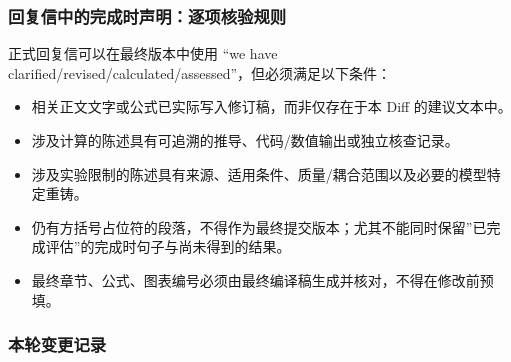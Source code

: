 \documentclass[
]{article}
\providecommand{\tightlist}{%
  \setlength{\itemsep}{0pt}\setlength{\parskip}{0pt}}
\begin{document}
\subsubsection{回复信中的完成时声明：逐项核验规则}\label{ux56deux590dux4fe1ux4e2dux7684ux5b8cux6210ux65f6ux58f0ux660eux9010ux9879ux6838ux9a8cux89c4ux5219}

正式回复信可以在最终版本中使用 ``we have
clarified/revised/calculated/assessed''，但必须满足以下条件：

\begin{itemize}
\tightlist
\item
  相关正文文字或公式已实际写入修订稿，而非仅存在于本 Diff 的建议文本中。
\item
  涉及计算的陈述具有可追溯的推导、代码/数值输出或独立核查记录。
\item
  涉及实验限制的陈述具有来源、适用条件、质量/耦合范围以及必要的模型特定重铸。
\item
  仍有方括号占位符的段落，不得作为最终提交版本；尤其不能同时保留''已完成评估''的完成时句子与尚未得到的结果。
\item
  最终章节、公式、图表编号必须由最终编译稿生成并核对，不得在修改前预填。
\end{itemize}

\subsubsection{本轮变更记录}\label{ux672cux8f6eux53d8ux66f4ux8bb0ux5f55}
\end{document}
